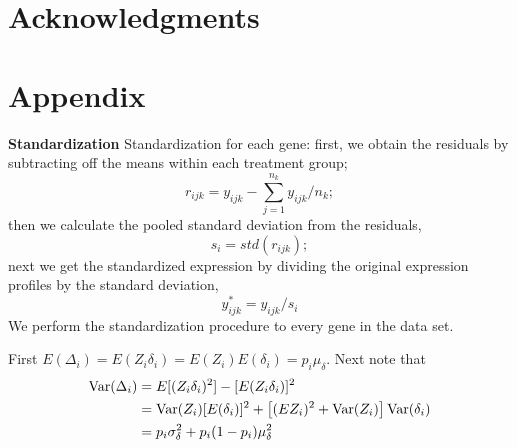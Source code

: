 \documentclass[useAMS,usenatbib, galley]{biom}
\begin{document}
	
	
	
	
	
	\section{Acknowledgments}\label{section:acknowledgment}
	
	
	
	\newpage
	
	
	
		
	
	\section*{Appendix}\label{section:appendix}
	
		
		\textbf{Standardization} 
		Standardization for each gene: first, we obtain the residuals by subtracting off the means within each treatment group;
		\begin{equation}
		r_{ijk} = y_{ijk} - \sum_{j=1}^{n_k}{y}_{ijk}/n_k;
		\end{equation}
		then we calculate the pooled standard deviation from the residuals,
		\begin{equation}
		s_i = \textit{std}(r_{ijk});
		\end{equation}
		next we get the standardized expression by dividing the original expression profiles by the standard deviation,
		\begin{equation}
		y^{\ast}_{ijk} = y_{ijk}/s_i
		\end{equation}
		We perform the standardization procedure to every gene in the data set. 
		
	
	First $E(\Delta_i) = E(Z_i\delta_i) = E(Z_i)E(\delta_i) = p_i\mu_{\delta}$. Next note that  
	\begin{equation}\notag
	\begin{aligned}
	\text{Var}(\Delta_i) & = E[(Z_i\delta_i)^2]- [E(Z_i\delta_i)]^2 \\
	& = \text{Var}(Z_i)[E(\delta_i)]^2 + \left[(EZ_i)^2 + \text{Var}(Z_i)\right]\text{Var}(\delta_i) \\
	& =p_i\sigma_{\delta}^2 + p_i(1-p_i)\mu_{\delta}^2
	\end{aligned}
	\end{equation}
	
\end{document}
